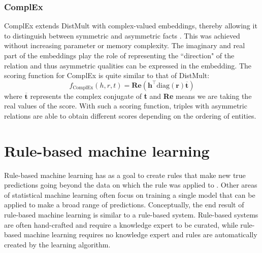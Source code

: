 \subsubsection{ComplEx}
ComplEx extends DistMult with complex-valued embeddings, thereby allowing it to distinguish between symmetric and asymmetric facts \cite{complEx}. This was achieved without increasing parameter or memory complexity. The imaginary and real part of the embeddings play the role of representing the ``direction" of the relation and thus asymmetric qualities can be expressed in the embedding. The scoring function for ComplEx is quite similar to that of DistMult:
\[f_ {\text{ComplEx}}(h, r, t) =\textbf{Re}(\textbf{h}^{\top}\text{diag}(\textbf{r})\overline{\textbf{t}})\]
where $\overline{\textbf{t}}$ represents the complex conjugate of \textbf{t} and \textbf{Re} means we are taking the real values of the score. With such a scoring function, triples with asymmetric relations are able to obtain different scores depending on the ordering of entities.
    

\section{Rule-based machine learning}
Rule-based machine learning has as a goal to create rules that make new true predictions going beyond the data on which the rule was applied to \cite{weiss1995rule}. Other areas of statistical machine learning often focus on training a single model that can be applied to make a broad range of predictions. Conceptually, the end result of rule-based machine learning is similar to a rule-based system.  Rule-based systems are often hand-crafted and require a knowledge expert to be curated, while rule-based machine learning requires no knowledge expert and rules are automatically created by the learning algorithm.

